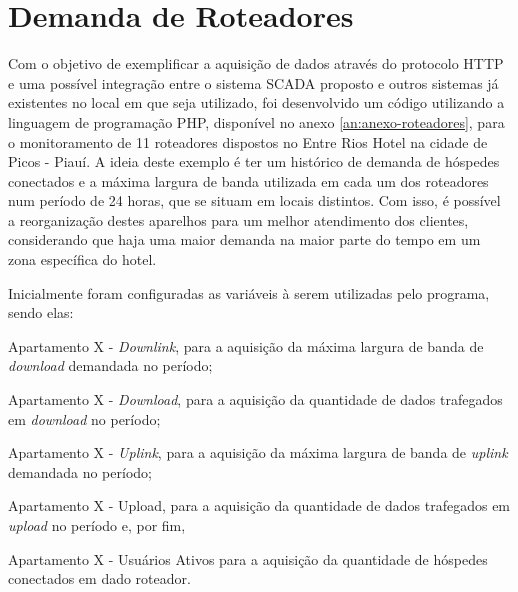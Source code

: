     	\begin{figure}[!h]
    	\end{figure}
    	

\section{Demanda de Roteadores}
\label{sec:demanda-roteadores}
Com o objetivo de exemplificar a aquisição de dados através do protocolo \gls{HTTP} e uma possível integração entre o sistema \gls{SCADA} proposto e outros sistemas já existentes no local em que seja utilizado, foi desenvolvido um código utilizando a linguagem de programação PHP, disponível no anexo \ref{an:anexo-roteadores}, para o monitoramento de 11 roteadores dispostos no Entre Rios Hotel na cidade de Picos - Piauí. A ideia deste exemplo é ter um histórico de demanda de hóspedes conectados e a máxima largura de banda utilizada em cada um dos roteadores num período de 24 horas, que se situam em locais distintos. Com isso, é possível a reorganização destes aparelhos para um melhor atendimento dos clientes, considerando que haja uma maior demanda na maior parte do tempo em um zona específica do hotel.

Inicialmente foram configuradas as variáveis à serem utilizadas pelo programa, sendo elas:

\begin{alineascomponto}
    \item Apartamento X - \textit{Downlink}, para a aquisição da máxima largura de banda de \textit{download} demandada no período;
    \item Apartamento X - \textit{Download}, para a aquisição da quantidade de dados trafegados em \textit{download} no período;
    \item Apartamento X - \textit{Uplink}, para a aquisição da máxima largura de banda de \textit{uplink} demandada no período;
    \item Apartamento X - Upload, para a aquisição da quantidade de dados trafegados em \textit{upload} no período e, por fim,
    \item Apartamento X - Usuários Ativos para a aquisição da quantidade de hóspedes conectados em dado roteador.
\end{alineascomponto}

